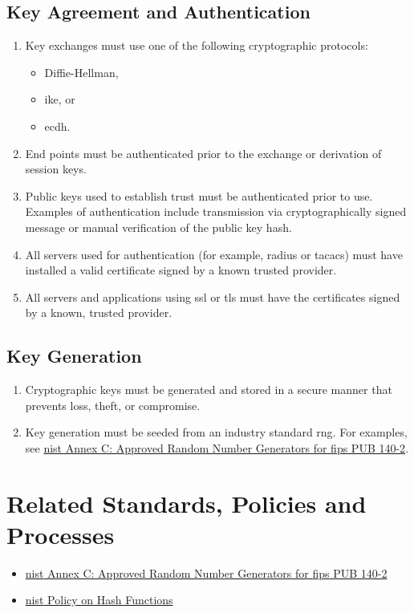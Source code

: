 \subsection{Key Agreement and Authentication}
\begin{enumerate}
\item
Key exchanges must use one of the following cryptographic protocols:
\begin{itemize}
\item{Diffie-Hellman},
\item{\gls{ike}}, or 
\item{\gls{ecdh}}.
\end{itemize}
\item
End points must be authenticated prior to the exchange or derivation of session keys.
\item
Public keys used to establish trust must be authenticated prior to use.  
Examples of authentication include transmission via cryptographically signed message or manual verification of the public key hash.
\item
All servers used for authentication (for example, \gls{radius} or \gls{tacacs}) must have installed a valid certificate signed by a known trusted provider.
\item
All servers and applications using \gls{ssl} or \gls{tls} must have the certificates signed by a known, trusted provider. 
\end{enumerate}

\subsection{Key Generation}
\begin{enumerate}
\item
Cryptographic keys must be generated and stored in a secure manner that prevents loss, theft, or compromise. 
\item
Key generation must be seeded from an industry standard \gls{rng}.  
For examples, see \href{http://csrc.nist.gov/publications/fips/fips140-2/fips1402annexc.pdf}{\acrshort{nist} Annex C: Approved Random Number Generators for \acrshort{fips} PUB 140-2}.  
\end{enumerate}



\CommonPolicyCompliance
\section{Related Standards, Policies\oxford{} and Processes}
\begin{itemize}
\item
\href{http://csrc.nist.gov/publications/fips/fips140-2/fips1402annexc.pdf}{\acrshort{nist} Annex C: Approved Random Number Generators for \acrshort{fips} PUB 140-2}
\item
\href{http://csrc.nist.gov/groups/ST/hash/policy.html}{\acrshort{nist} Policy on Hash Functions}
\end{itemize}



